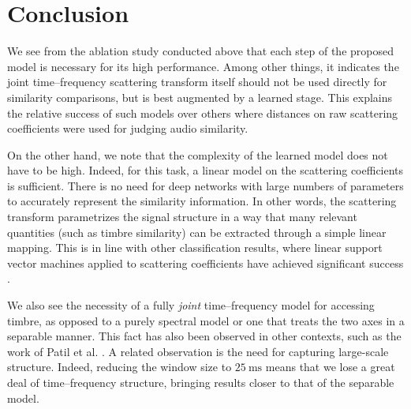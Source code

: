 \documentclass{bmcart}
\newcommand{\nmu}{}
\begin{document}


\section*{\nmu Conclusion}
\label{sec:conclusion}

We see from the ablation study conducted above that each step of the proposed model is necessary for its high performance.
Among other things, it indicates the joint time--frequency scattering transform itself should not be used directly for similarity comparisons, but is best augmented by a learned stage.
This explains the relative success of such models \cite{lostanlen2018jasmp,lostanlen2018extended} over others where distances on raw scattering coefficients were used for judging audio similarity.

On the other hand, we note that the complexity of the learned model does not have to be high.
Indeed, for this task, a linear model on the scattering coefficients is sufficient.
There is no need for deep networks with large numbers of parameters to accurately represent the similarity information.
In other words, the scattering transform parametrizes the signal structure in a way that many relevant quantities (such as timbre similarity) can be extracted through a simple linear mapping.
This is in line with other classification results, where linear support vector machines applied to scattering coefficients have achieved significant success \cite{anden2015mlsp,anden2019tsp}.

We also see the necessity of a fully \emph{joint} time--frequency model for accessing timbre, as opposed to a purely spectral model or one that treats the two axes in a separable manner.
This fact has also been observed in other contexts, such as the work of Patil et al. \cite{patil2012ploscompbiol}.
A related observation is the need for capturing large-scale structure.
Indeed, reducing the window size to $25~\mathrm{ms}$ means that we lose a great deal of time--frequency structure, bringing results closer to that of the separable model.
\end{document}
